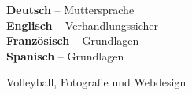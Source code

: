 \documentclass[9pt]{developercv} %
\begin{document}

\begin{minipage}[t]{0.45\textwidth}
	\vspace{-\baselineskip} %


	\textbf{Deutsch} -- Muttersprache\\
	\textbf{Englisch} -- Verhandlungssicher\\
    \textbf{Französisch} -- Grundlagen\\
    \textbf{Spanisch} -- Grundlagen
\end{minipage}
\hfill
\begin{minipage}[t]{0.45\textwidth}
	\vspace{-\baselineskip} %


	Volleyball, Fotografie und Webdesign
\end{minipage}

\end{document}
